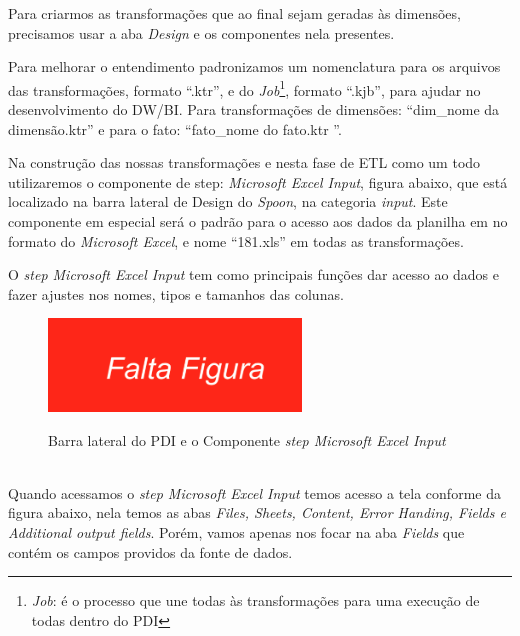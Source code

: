 Para criarmos as transforma\c{c}\~{o}es que ao final sejam geradas \`{a}s dimens\~{o}es, precisamos usar a aba \textit{Design} e os componentes nela presentes.

Para melhorar o entendimento padronizamos um nomenclatura para os arquivos das transforma\c{c}\~{o}es, formato ``.ktr'', e do \textit{Job}\footnote{\textit{Job}: \'{e} o processo que une todas \`{a}s transforma\c{c}\~{o}es para uma execu\c{c}\~{a}o de todas dentro do PDI}, formato ``.kjb'', para ajudar no desenvolvimento do DW/BI. Para transforma\c{c}\~{o}es de dimens\~{o}es: ``dim\_nome da dimens\~{a}o.ktr'' e para o fato: ``fato\_nome do fato.ktr
''.

Na constru\c{c}\~{a}o das nossas transforma\c{c}\~{o}es e nesta fase de ETL como um todo utilizaremos o componente de step: \textit{Microsoft Excel Input}, figura abaixo, que est\'{a} localizado na barra lateral de Design do \textit{Spoon}, na categoria \textit{input}. Este componente em especial ser\'{a} o padr\~{a}o para o acesso aos dados da planilha em no formato do \textit{Microsoft Excel}, e nome ``181.xls'' em todas as transforma\c{c}\~{o}es.

O \textit{step Microsoft Excel Input} tem como principais fun\c{c}\~{o}es dar acesso ao dados e fazer ajustes nos nomes, tipos e tamanhos das colunas.

\begin{figure}[H]
	\vspace*{0,2cm}
    \centering
    \caption{Barra lateral do PDI e o Componente \textit{step Microsoft Excel Input}}
    \includegraphics[width=0.6\textwidth]{./04-figuras/falta-figura.png}
    \label{fig:ilustfigfaltafigura02}
\end{figure}
\vspace*{-0,9cm}
{\raggedright {}} \\

Quando acessamos o \textit{step Microsoft Excel Input} temos acesso a tela conforme da figura abaixo, nela temos as abas \textit{Files, Sheets, Content, Error Handing, Fields e Additional output fields}. Por\'{e}m, vamos apenas nos focar na aba \textit{Fields} que cont\'{e}m os campos providos da fonte de dados. 

